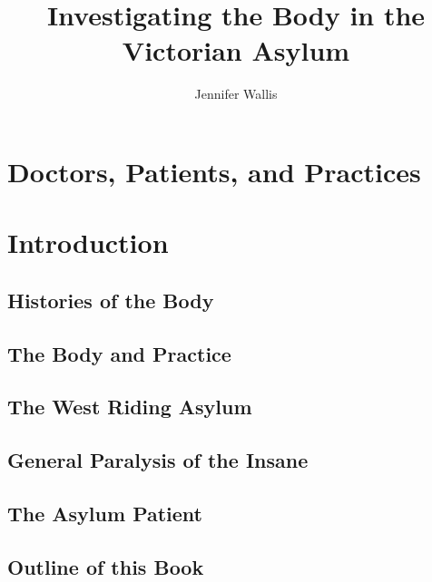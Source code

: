 \documentclass[
  openany]{book}
\title{Investigating the Body in the Victorian Asylum}
\author{Jennifer Wallis}
\date{}
\begin{document}
\maketitle

{
\setcounter{tocdepth}{1}
\tableofcontents
}
\hypertarget{doctors-patients-and-practices}{%
\chapter{Doctors, Patients, and Practices}\label{doctors-patients-and-practices}}

\hypertarget{introduction}{%
\chapter{Introduction}\label{introduction}}

\hypertarget{histories-of-the-body}{%
\section{Histories of the Body}\label{histories-of-the-body}}

\hypertarget{the-body-and-practice}{%
\section{The Body and Practice}\label{the-body-and-practice}}

\hypertarget{the-west-riding-asylum}{%
\section{The West Riding Asylum}\label{the-west-riding-asylum}}

\hypertarget{general-paralysis-of-the-insane}{%
\section{General Paralysis of the Insane}\label{general-paralysis-of-the-insane}}

\hypertarget{the-asylum-patient}{%
\section{The Asylum Patient}\label{the-asylum-patient}}

\hypertarget{outline-of-this-book}{%
\section{Outline of this Book}\label{outline-of-this-book}}
\end{document}
